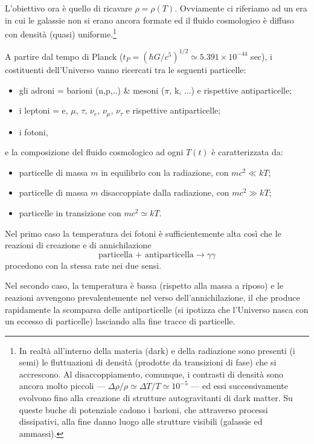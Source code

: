 L'obiettivo ora è quello di ricavare $\rho= \rho(T)$.  Ovviamente ci riferiamo
ad un era in cui le galassie non si erano ancora formate ed il fluido
cosmologico è diffuso con densità (quasi) uniforme.\footnote{In realtà
  all'interno della materia (dark) e della radiazione sono presenti (i semi) le
  fluttuazioni di densità (prodotte da transizioni di fase) che si accrescono.
  Al disaccoppiamento, comunque, i contrasti di densità sono ancora molto
  piccoli --- $\Delta \rho / \rho \simeq \Delta T / T \simeq 10^{-5}$ --- ed
  essi successivamente evolvono fino alla creazione di strutture autogravitanti
  di dark matter.  Su queste buche di potenziale cadono i barioni, che
  attraverso processi dissipativi, alla fine danno luogo alle strutture visibili
  (galassie ed ammassi).}

A partire dal tempo di Planck ($t_P = ( \hbar G/c^5)^{1/2} \simeq 5.391 \times
10^{-44}$ sec), i costituenti dell'Universo vanno ricercati
tra le seguenti particelle:
\begin{itemize}
\item gli adroni = barioni (n,p,..) \& mesoni ($\pi$, k, ...) e rispettive
  antiparticelle;
\item i leptoni = e, $\mu$, $\tau$, $\nu_e$, $\nu_{\mu}$, $\nu_{\tau}$ e
  rispettive antiparticelle;
\item i fotoni,
\end{itemize}
e la composizione del fluido cosmologico ad ogni $T(t)$ è caratterizzata da:
\begin{itemize}
\item particelle di massa $m$ in equilibrio con la radiazione, con $mc^2\ll kT$;
\item particelle di massa $m$ disaccoppiate dalla radiazione, con $mc^2\gg kT$;
\item particelle in transizione con $mc^2 \simeq kT$.
\end{itemize}
Nel primo caso la temperatura dei fotoni è sufficientemente alta così che le
reazioni di creazione e di annichilazione
\begin{equation}
  \text{particella + antiparticella} \to \gamma \gamma
\end{equation}
procedono con la stessa rate nei due sensi.

Nel secondo caso, la temperatura è bassa (rispetto alla massa a riposo) e le
reazioni avvengono prevalentemente nel verso dell'annichilazione, il che produce
rapidamente la scomparsa delle antiparticelle (si ipotizza che l'Universo nasca
con un eccesso di particelle) lasciando alla fine tracce di particelle.


